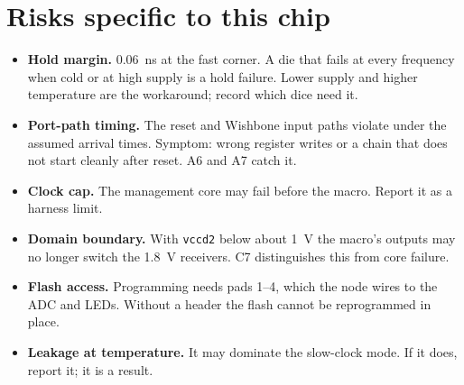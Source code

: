 \documentclass[10pt]{article}
\begin{document}
\section{Risks specific to this chip}
\begin{itemize}
\item \textbf{Hold margin.} \SI{0.06}{\nano\second} at the fast corner.
A die that fails at every frequency when cold or at high supply is a hold
failure. Lower supply and higher temperature are the workaround; record
which dice need it.
\item \textbf{Port-path timing.} The reset and Wishbone input paths
violate under the assumed arrival times. Symptom: wrong register writes
or a chain that does not start cleanly after reset. A6 and A7 catch it.
\item \textbf{Clock cap.} The management core may fail before the macro.
Report it as a harness limit.
\item \textbf{Domain boundary.} With \texttt{vccd2} below about
\SI{1}{\volt} the macro's outputs may no longer switch the
\SI{1.8}{\volt} receivers. C7 distinguishes this from core failure.
\item \textbf{Flash access.} Programming needs pads 1--4, which the node
wires to the ADC and LEDs. Without a header the flash cannot be
reprogrammed in place.
\item \textbf{Leakage at temperature.} It may dominate the slow-clock
mode. If it does, report it; it is a result.
\end{itemize}

\appendix
\end{document}
